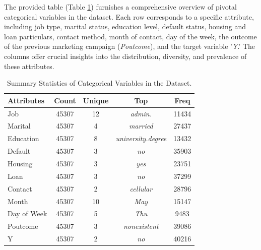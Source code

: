 \documentclass{article}
\begin{document}
           The provided table (Table \ref{tab:my_label}) furnishes a comprehensive overview of pivotal categorical variables in the dataset. Each row corresponds to a specific attribute, including job type, marital status, education level, default status, housing and loan particulars, contact method, month of contact, day of the week, the outcome of the previous marketing campaign (\textit{Poutcome}), and the target variable '\textit{Y}.' The columns offer crucial insights into the distribution, diversity, and prevalence of these attributes.
           
           \begin{table}[h]
               \centering
               \begin{tabular}{lcccc}
                   \textbf{Attributes} & \textbf{Count} & \textbf{Unique} & \textbf{Top} & \textbf{Freq} \\
                   \hline
                   Job & 45307 & 12 & \textit{admin.} & 11434 \\ 
                   Marital & 45307 & 4 & \textit{married} & 27437 \\ 
                   Education & 45307 & 8 & \textit{university.degree} & 13432 \\ 
                   Default & 45307 & 3 & \textit{no} & 35903 \\ 
                   Housing & 45307 & 3 & \textit{yes} & 23751 \\ 
                   Loan & 45307 & 3 & \textit{no} & 37299 \\ 
                   Contact & 45307 & 2 & \textit{cellular} & 28796 \\ 
                   Month & 45307 & 10 & \textit{May} & 15147 \\ 
                   Day of Week & 45307 & 5 & \textit{Thu} & 9483 \\ 
                   Poutcome & 45307 & 3 & \textit{nonexistent} & 39086 \\ 
                   Y & 45307 & 2 & \textit{no} & 40216 \\ 
               \end{tabular}
               \caption{Summary Statistics of Categorical Variables in the Dataset.}
               \label{tab:my_label}
               \end{table}
           
\end{document}
